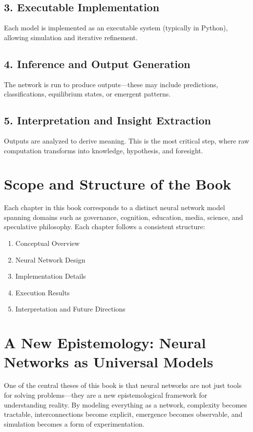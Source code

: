 \documentclass[12pt]{article}
\begin{document}
\subsection*{3. Executable Implementation}
Each model is implemented as an executable system (typically in Python), allowing simulation and iterative refinement.

\subsection*{4. Inference and Output Generation}
The network is run to produce outputs—these may include predictions, classifications, equilibrium states, or emergent patterns.

\subsection*{5. Interpretation and Insight Extraction}
Outputs are analyzed to derive meaning. This is the most critical step, where raw computation transforms into knowledge, hypothesis, and foresight.

\section*{Scope and Structure of the Book}

Each chapter in this book corresponds to a distinct neural network model spanning domains such as governance, cognition, education, media, science, and speculative philosophy. Each chapter follows a consistent structure:
\begin{enumerate}
\item Conceptual Overview
\item Neural Network Design
\item Implementation Details
\item Execution Results
\item Interpretation and Future Directions
\end{enumerate}

\section*{A New Epistemology: Neural Networks as Universal Models}

One of the central theses of this book is that neural networks are not just tools for solving problems—they are a new epistemological framework for understanding reality. By modeling everything as a network, complexity becomes tractable, interconnections become explicit, emergence becomes observable, and simulation becomes a form of experimentation.
\end{document}

